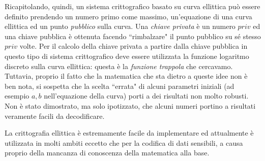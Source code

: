 Ricapitolando, quindi, un sistema crittografico basato su curva ellittica può essere definito prendendo un numero primo come massimo, un'equazione di una curva ellittica ed un punto \textit{pubblico} sulla curva. Una \textit{chiave privata} è un numero $priv$ ed una chiave pubblica è ottenuta facendo \textquotedblleft rimbalzare" il punto pubblico su sé stesso $priv$ volte. Per il calcolo della chiave privata a partire dalla chiave pubblica in questo tipo di sistema crittografico deve essere utilizzata la funzione logaritmo discreto sulla curva ellittica: questa è la \textit{funzione trappola} che cercavamo. Tuttavia, proprio il fatto che la matematica che sta dietro a queste idee non è ben nota, si sospetta che la scelta \textquotedblleft errata" di alcuni parametri iniziali (ad esempio $a, b$ nell'equazione della curva) porti a dei risultati non molto robusti. Non è stato dimostrato, ma solo ipotizzato, che alcuni numeri portino a risultati veramente facili da decodificare.

La crittografia ellittica è estremamente facile da implementare ed attualmente è utilizzata in molti ambiti eccetto che per la codifica di dati sensibili, a causa proprio della mancanza di conoscenza della matematica alla base.
